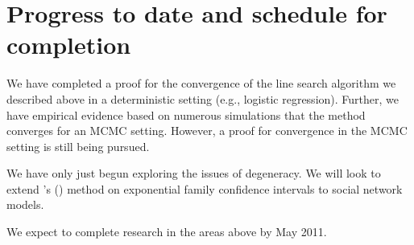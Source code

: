 \documentclass[12pt]{article}
\begin{document}





\section{Progress to date and schedule for completion}
We have completed a proof for the convergence of the line search algorithm we described above in a deterministic setting (e.g., logistic regression).  Further, we have empirical evidence based on numerous simulations that the method converges for an MCMC setting.  However, a proof for convergence in the MCMC setting is still being pursued.  

We have only just begun exploring the issues of degeneracy.  We will look to extend \citeauthor{Geyer:gdor}'s (\citeyear{Geyer:gdor}) method on exponential family confidence intervals to social network models.

We expect to complete research in the areas above by May 2011.

\newpage




%

%


%

% 
\end{document}

